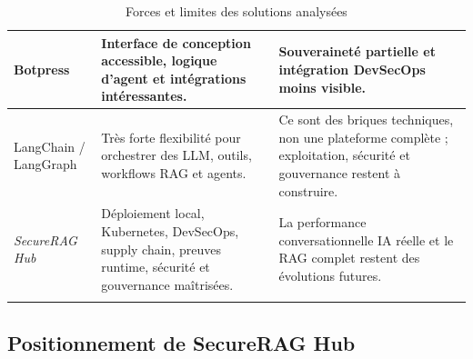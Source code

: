\begin{longtable}{|p{3.2cm}|p{5.4cm}|p{5.4cm}|}
Botpress &
Interface de conception accessible, logique d’agent et intégrations intéressantes. &
Souveraineté partielle et intégration DevSecOps moins visible. \\
\hline

LangChain / LangGraph &
Très forte flexibilité pour orchestrer des LLM, outils, workflows RAG et agents. &
Ce sont des briques techniques, non une plateforme complète ; exploitation, sécurité et gouvernance restent à construire. \\
\hline

\textit{SecureRAG Hub} &
Déploiement local, Kubernetes, DevSecOps, supply chain, preuves runtime, sécurité et gouvernance maîtrisées. &
La performance conversationnelle IA réelle et le RAG complet restent des évolutions futures. \\
\hline

\caption{Forces et limites des solutions analysées}
\label{tab:forces_limites_solutions}
\end{longtable}
\subsection{Positionnement de SecureRAG Hub}

